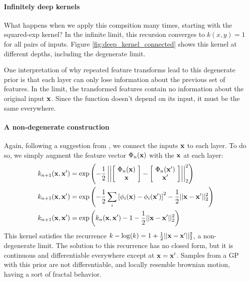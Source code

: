 \documentclass{article}
\begin{document}
\paragraph{Infinitely deep kernels}
What happens when we apply this compsition many times, starting with the squared-exp kernel?  In the infinite limit, this recursion converges to $k(x,y) = 1$ for all pairs of inputs.  Figure \ref{fig:deep_kernel_connected} shows this kernel at different depths, including the degenerate limit.  

One interpretation of why repeated feature transforms lead to this degenerate prior is that each layer can only lose information about the previous set of features.  In the limit, the transformed features contain no information about the original input ${\bf{x}}$.  Since the function doesn't depend on its input, it must be the same everywhere.

\paragraph{A non-degenerate construction}

Again, following a suggestion from \cite{neal1995bayesian}, we connect the inputs ${\bf{x}}$ to each layer.  To do so, we simply augment the feature vector $\Phi_n({\bf{x}})$ with the ${\bf{x}}$ at each layer:
%
\begin{align}
k_{n+1}({\bf{x}}, {\bf{x}}') & = \exp \left( -\frac{1}{2} \left|\left| \left[ \! \begin{array}{c} \Phi_n({\bf{x}}) \\ {\bf{x}} \end{array} \! \right]  - \left[ \! \begin{array}{c} \Phi_n({\bf{x}}') \\ {\bf{x}}' \end{array} \! \right] \right| \right|_2^2 \right) \\
k_{n+1}({\bf{x}}, {\bf{x}}') & = \exp \left( -\frac{1}{2} \sum_i \left[ \phi_i({\bf{x}}) - \phi_i({\bf{x}}') \right]^2 -\frac{1}{2} || {\bf{x}} - {\bf{x}}' ||_2^2 \right) \\
k_{n+1}({\bf{x}}, {\bf{x}}') & = \exp \left( k_n({\bf{x}}, {\bf{x}}') - 1 -\frac{1}{2} || {\bf{x}} - {\bf{x}}' ||_2^2 \right)
\end{align}
%
%
This kernel satisfies the recurrence $k - \log(k) = 1 + \frac{1}{2} || {\bf{x}} - {\bf{x}}' ||_2^2$, a non-degenerate limit.  The solution to this recurrence has no closed form, but it is continuous and differentiable everywhere except at ${\bf{x}} = {\bf{x}}'$.
%
Samples from a GP with this prior are not differentiable, and locally resemble brownian motion, having a sort of fractal behavior.
\end{document}
